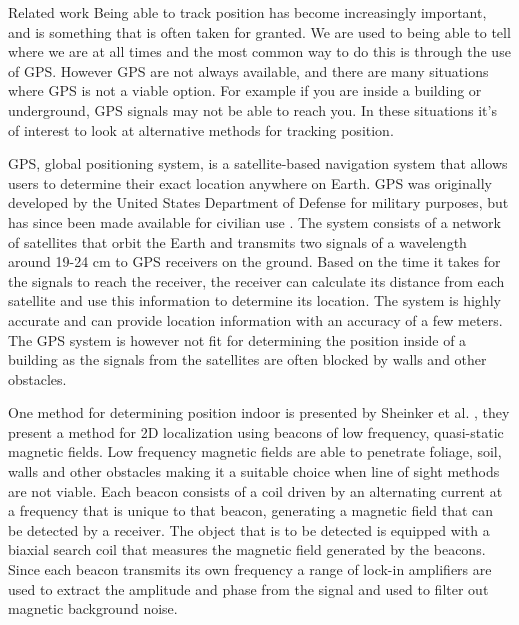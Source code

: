 \newpage
\begin{section}{Related work}
    Being able to track position has become increasingly important, and is something that is often taken for granted.
    We are used to being able to tell where we are at all times and the most common way to do this is through the use of GPS.
    However GPS are not always available, and there are many situations where GPS is not a viable option.
    For example if you are inside a building or underground, GPS signals may not be able to reach you.
    In these situations it's of interest to look at alternative methods for tracking position.

    GPS, global positioning system, is a satellite-based navigation system that allows users to determine their exact location anywhere on Earth.
    GPS was originally developed by the United States Department of Defense for military purposes, but has since been made available for civilian use \cite{GPS}.
    The system consists of a network of satellites that orbit the Earth and transmits two signals of a wavelength around 19-24 cm to GPS receivers on the ground.
    Based on the time it takes for the signals to reach the receiver, the receiver can calculate its distance from each satellite and use this information to determine its location.
    The system is highly accurate and can provide location information with an accuracy of a few meters.
    The GPS system is however not fit for determining the position inside of a building as the signals from the satellites are often blocked by walls and other obstacles.

    One method for determining position indoor is presented by Sheinker et al. \cite{sheinker2013localization}, they present a method for 2D localization using beacons of low frequency, quasi-static magnetic fields.
    Low frequency magnetic fields are able to penetrate foliage, soil, walls and other obstacles making it a suitable choice when line of sight methods are not viable.
    Each beacon consists of a coil driven by an alternating current at a frequency that is unique to that beacon, generating a magnetic field that can be detected by a receiver. 
    The object that is to be detected is equipped with a biaxial search coil that measures the magnetic field generated by the beacons. 
    Since each beacon transmits its own frequency a range of lock-in amplifiers are used to extract the amplitude and phase from the signal and used to filter out magnetic background noise. 


\end{section}
